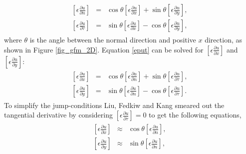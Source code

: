 \begin{eqnarray}
\begin{aligned}
			\left[\epsilon \frac{\partial u}{\partial n}\right] &=& \cos \theta \left[\epsilon \frac{\partial u}{\partial x}\right] + \sin \theta \left[\epsilon \frac{\partial u}{\partial y}\right],\label{epun} \\
			\left[\epsilon \frac{\partial u}{\partial \tau}\right] &=& \sin \theta \left[\epsilon \frac{\partial u}{\partial x}\right] - \cos \theta\left[\epsilon \frac{\partial u}{\partial y}\right],\label{eput}	
\end{aligned}		
\end{eqnarray}
where $\theta$ is the angle between the normal direction and positive $x$ direction, as shown in Figure \ref{fig_gfm_2D}. 
Equation \ref{eput} can be solved for $ \left[\epsilon \frac{\partial u}{\partial x}\right]$ and $\left[\epsilon \frac{\partial u}{\partial y}\right]$:
\begin{eqnarray}
\begin{aligned}
	\left[\epsilon \frac{\partial u}{\partial x}\right] &=& \cos \theta \left[\epsilon \frac{\partial u}{\partial n}\right] +\sin \theta \left[\epsilon \frac{\partial u}{\partial \tau}\right],\label{epux1} \\
	\left[\epsilon \frac{\partial u}{\partial y}\right] &=& \sin \theta \left[\epsilon \frac{\partial u}{\partial n}\right] -\cos \theta \left[\epsilon \frac{\partial u}{\partial \tau}\right].\label{epuy1}
\end{aligned}	
\end{eqnarray}
To simplify the jump-conditions Liu, Fedkiw and Kang \cite{Liu2000}  smeared out the tangential derivative by considering $\left[\epsilon \frac{\partial u}{\partial \tau}\right]=0$ to get the following equations, 
\begin{eqnarray}
\begin{aligned}
	\left[\epsilon \frac{\partial u}{\partial x}\right] &\approx& \cos \theta \left[\epsilon \frac{\partial u}{\partial n}\right],\label{epux2}   \\
	\left[\epsilon \frac{\partial u}{\partial y}\right] &\approx& \sin \theta \left[\epsilon \frac{\partial u}{\partial n}\right], \label{epuy2}
\end{aligned}	
\end{eqnarray}
